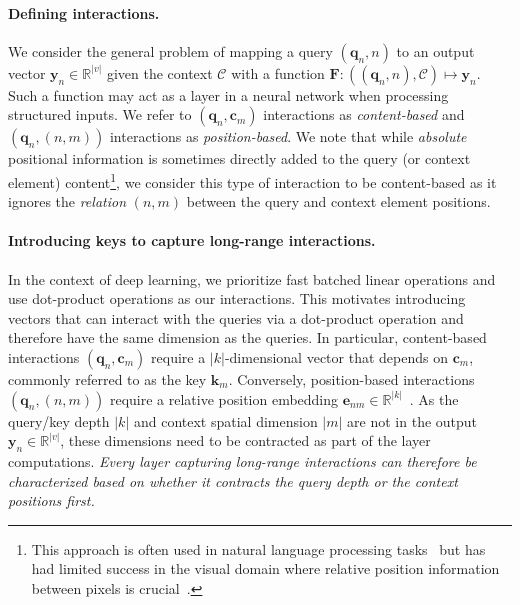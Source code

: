 \documentclass{article} \usepackage{iclr2021_conference,times}
\begin{document}
\vspace{-0.1cm}
\paragraph{Defining interactions.}
We consider the general problem of mapping a query $(\boldsymbol{q}_n, n)$ to an output vector $\boldsymbol{y}_n \in \mathbb{R}^{|v|}$ given the context $\mathcal{C}$ with a function $\boldsymbol{F}: ((\boldsymbol{q}_n, n), \mathcal{C}) \mapsto \boldsymbol{y}_n$.
Such a function may act as a layer in a neural network when processing structured inputs.
We refer to $(\boldsymbol{q}_n, \boldsymbol{c}_m)$ interactions as \emph{content-based} and $(\boldsymbol{q}_n, (n, m))$ interactions as \emph{position-based}.
We note that while \emph{absolute} positional information is sometimes directly added to the query (or context element) content\footnote{This approach is often used in natural language processing tasks~\citep{vaswani2017attention} but has had limited success in the visual domain where relative position information between pixels is crucial~\citep{bello2019aacn}.}, we consider this type of interaction to be content-based as it ignores the \emph{relation} $(n, m)$ between the query and context element positions.

\vspace{-0.1cm}
\paragraph{Introducing keys to capture long-range interactions.}
In the context of deep learning, we prioritize fast batched linear operations and use dot-product operations as our interactions.
This motivates introducing vectors that can interact with the queries via a dot-product operation and therefore have the same dimension as the queries.
In particular, content-based interactions $(\boldsymbol{q}_n, \boldsymbol{c}_m)$ require a $|k|$-dimensional vector that depends on $\boldsymbol{c}_m$, commonly referred to as the key $\boldsymbol{k}_m$.
Conversely, position-based interactions $(\boldsymbol{q}_n, (n, m))$ require a relative position embedding $\boldsymbol{e}_{nm} \in \mathbb{R}^{|k|}$~\citep{shaw2018relative}.
As the query/key depth $|k|$ and context spatial dimension $|m|$ are not in the output $\boldsymbol{y}_n \in \mathbb{R}^{|v|}$, these dimensions need to be contracted as part of the layer computations.
\emph{Every layer capturing long-range interactions can therefore be characterized based on whether it contracts the query depth or the context positions first.}
\end{document}

